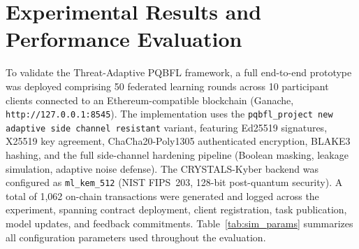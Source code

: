 \documentclass[journal, 10pt, twocolumn]{IEEEtran}
\begin{document}
\section{Experimental Results and Performance Evaluation}
To validate the Threat-Adaptive PQBFL framework, a full end-to-end prototype was deployed comprising 50 federated learning rounds across 10 participant clients connected to an Ethereum-compatible blockchain (Ganache, \texttt{http://127.0.0.1:8545}). The implementation uses the \texttt{pqbfl\_project new adaptive side channel resistant} variant, featuring Ed25519 signatures, X25519 key agreement, ChaCha20-Poly1305 authenticated encryption, BLAKE3 hashing, and the full side-channel hardening pipeline (Boolean masking, leakage simulation, adaptive noise defense). The CRYSTALS-Kyber backend was configured as \texttt{ml\_kem\_512} (NIST FIPS~203, 128-bit post-quantum security). A total of 1,062 on-chain transactions were generated and logged across the experiment, spanning contract deployment, client registration, task publication, model updates, and feedback commitments. Table~\ref{tab:sim_params} summarizes all configuration parameters used throughout the evaluation.
\end{document}
